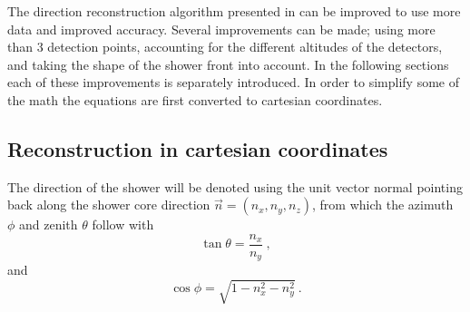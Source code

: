 The direction reconstruction algorithm presented in \cite{fokkema2012hisparc} can be improved to use more data and improved accuracy. Several improvements can be made; using more than 3 detection points, accounting for the different altitudes of the detectors, and taking the shape of the shower front into account. In the following sections each of these improvements is separately introduced. In order to simplify some of the math the equations are first converted to cartesian coordinates.


\subsection{Reconstruction in cartesian coordinates}

The direction of the shower will be denoted using the unit vector normal pointing back along the shower core direction $\vec n = (n_x, n_y, n_z)$, from which the azimuth $\phi$ and zenith $\theta$ follow with
%
\begin{equation}
    \tan \theta = \frac{n_x}{n_y} \ ,
\end{equation}
%
and
%
\begin{equation}
    \cos \phi = \sqrt{1 - n_x^2 - n_y^2} \ .
\end{equation}

